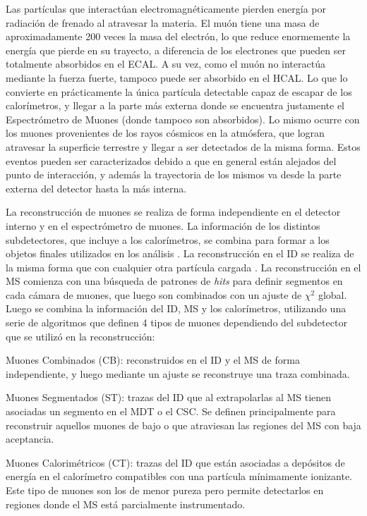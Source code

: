 Las partículas que interactúan electromagnéticamente pierden energía por radiación de frenado al atravesar la materia. El muón tiene una masa de aproximadamente 200 veces la masa del electrón, lo que reduce enormemente la energía que pierde en su trayecto, a diferencia de los electrones que pueden ser totalmente absorbidos en el ECAL. A su vez, como el muón no interactúa mediante la fuerza fuerte, tampoco puede ser absorbido en el HCAL. Lo que lo convierte en prácticamente la única partícula detectable capaz de escapar de los calorímetros, y llegar a la parte más externa donde se encuentra justamente el Espectrómetro de Muones (donde tampoco son absorbidos). Lo mismo ocurre con los muones provenientes de los rayos cósmicos en la atmósfera, que logran atravesar la superficie terrestre y llegar a ser detectados de la misma forma. Estos eventos pueden ser caracterizados debido a que en general están alejados del punto de interacción, y además la trayectoria de los mismos va desde la parte externa del detector hasta la más interna.


La reconstrucción de muones se realiza de forma independiente en el detector interno y en el espectrómetro de muones. La información de los distintos subdetectores, que incluye a los calorímetros, se combina para formar a los objetos finales utilizados en los análisis \cite{PERF-2015-10}. La reconstrucción en el ID se realiza de la misma forma que con cualquier otra partícula cargada \cite{Cornelissen:1020106, ATLAS-CONF-2010-072}. La reconstrucción en el MS comienza con una búsqueda de patrones de \textit{hits} para definir segmentos en cada cámara de muones, que luego son combinados con un ajuste de $\chi^2$ global. Luego se combina la información del ID, MS y los calorímetros, utilizando una serie de algoritmos que definen 4 tipos de muones dependiendo del subdetector que se utilizó en la reconstrucción:


Muones Combinados (CB): reconstruidos en el ID y el MS de forma independiente, y luego mediante un ajuste se reconstruye una traza combinada.

Muones Segmentados (ST): trazas del ID que al extrapolarlas al MS tienen asociadas un segmento en el MDT o el CSC. Se definen principalmente para reconstruir aquellos muones de bajo \pt o que atraviesan las regiones del MS con baja aceptancia.

Muones Calorimétricos (CT): trazas del ID que están asociadas a depósitos de energía en el calorímetro compatibles con una partícula mínimamente ionizante. Este tipo de muones son los de menor pureza pero permite detectarlos en regiones donde el MS está parcialmente instrumentado. 
 

